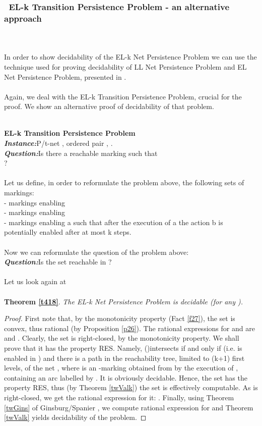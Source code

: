 \documentclass[a4paper]{llncs}
\begin{document}
\subsubsection{\textbullet \ EL-k Transition Persistence Problem - an alternative approach}\mbox{ }\\
\\
In order to show decidability of the EL-k Net Persistence Problem we can use the technique used for proving decidability of LL Net Persistence Problem and EL Net Persistence Problem, presented in \cite{BarOch}.
\\ \\
Again, we deal with the EL-k Transition Persistence Problem, crucial for the proof. We show an alternative proof of decidability of that problem.


\mbox{ }\\
\textbf{EL-k Transition Persistence Problem}
\\
\indent\textbf{\emph{Instance:}}P/t-net , ordered pair , .\\
\indent\textbf{\emph{Question:}}Is there a reachable marking  such that  \\
\indent\indent \indent\indent?
\\
\\
Let us define, in order to reformulate the problem above, the following sets of markings:\\
 - markings enabling  \\
 - markings enabling  \\
 - markings enabling a such that after the execution of a the action b is potentially enabled after at most k steps.
\\
\\
Now we can reformulate the question of the  problem above:
\\
\indent\textbf{\emph{Question:}}Is the set
 reachable in ?
\\
\\
Let us look again at\\ \\
\textbf{Theorem \ref{t418}}. 
\textit{The EL-k Net Persistence Problem is decidable (for any ).}

\begin{proof}
First note that, by the monotonicity property (Fact \ref{f27}), the set \newline is convex, thus rational (by Proposition \ref{p26}). The rational expressions for  and  are   and . Clearly, the set  is right-closed, by the monotonicity property. We shall prove that it has the property RES. Namely,  ()intersects  if and only if  (i.e.  is enabled in ) and there is a path in the reachability tree, limited to (k+1) first levels, of the net , where  is an  -marking obtained from  by the execution of , containing an arc labelled by . It is obviously decidable. Hence, the set  has the property RES, thus (by Theorem \ref{twValk}) the set  is effectively computable. As  is right-closed, we get the rational expression for it: . Finally, using Theorem \ref{twGins} of Ginsburg/Spanier \cite{GinsburgSpanier}, we compute rational expression for  and Theorem \ref{twValk} yields decidability of the problem. 	
\end{proof}
\end{document}
